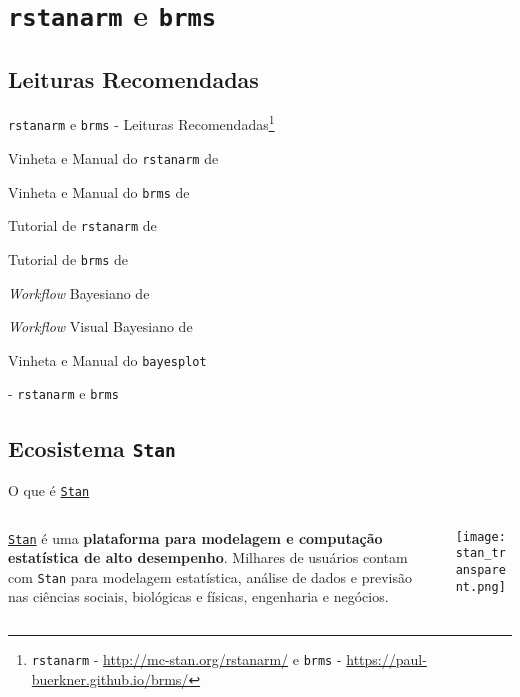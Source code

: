 \section{\texttt{rstanarm} e \texttt{brms}}

\subsection{Leituras Recomendadas}
\begin{frame}{\texttt{rstanarm} e \texttt{brms} - Leituras Recomendadas\footnote{\texttt{rstanarm} - \url{http://mc-stan.org/rstanarm/} e \texttt{brms} - \url{https://paul-buerkner.github.io/brms/}}}
    \begin{vfilleditems}
        \item Vinheta e Manual do \texttt{rstanarm} de \textcite{rstanarm}
        \item Vinheta e Manual do \texttt{brms} de \textcite{brms}
        \item Tutorial de \texttt{rstanarm} de \textcite{muth2018user}
        \item Tutorial de \texttt{brms} de \textcite{burknerAdvancedBayesianMultilevel2018}
        \item \textit{Workflow} Bayesiano de \textcite{gelmanBayesianWorkflow2020}
        \item \textit{Workflow} Visual Bayesiano de \textcite{gabryVisualizationBayesianWorkflow2019}
        \item Vinheta e Manual do \texttt{bayesplot} \textcite{bayesplot}
        \item \textcite{storopoli2021estatisticabayesianaR} - \texttt{rstanarm} e \texttt{brms}
    \end{vfilleditems}
\end{frame}

\subsection{Ecosistema \texttt{Stan}}
\begin{frame}{O que é \href{https://mc-stan.org}{\texttt{Stan}}}
    \begin{columns}
        \begin{column}{0.8\textwidth}
            \href{https://mc-stan.org}{\texttt{Stan}}
            \parencite{carpenterStanProbabilisticProgramming2017} é uma \textbf{plataforma para
            modelagem e computação estatística de alto desempenho}.
            Milhares de usuários contam com \texttt{Stan} para modelagem estatística,
            análise de dados e previsão nas ciências sociais, biológicas e físicas,
            engenharia e negócios.
        \end{column}
        \begin{column}{0.2\textwidth}
            \centering
            \texttt{[image: stan\_transparent.png]}
        \end{column}
    \end{columns}
\end{frame}

